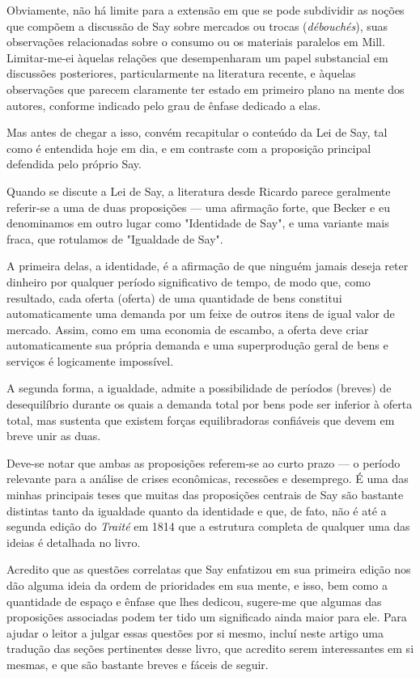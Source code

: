 \documentclass[12pt]{article}
\begin{document}
Obviamente, não há limite para a extensão em que se pode subdividir as noções que compõem a discussão de Say sobre mercados ou trocas (\textit{débouchés}), suas observações relacionadas sobre o consumo ou os materiais paralelos em Mill. Limitar-me-ei àquelas relações que desempenharam um papel substancial em discussões posteriores, particularmente na literatura recente, e àquelas observações que parecem claramente ter estado em primeiro plano na mente dos autores, conforme indicado pelo grau de ênfase dedicado a elas.

Mas antes de chegar a isso, convém recapitular o conteúdo da Lei de Say, tal como é entendida hoje em dia, e em contraste com a proposição principal defendida pelo próprio Say.

Quando se discute a Lei de Say, a literatura desde Ricardo parece geralmente referir-se a uma de duas proposições — uma afirmação forte, que Becker e eu denominamos em outro lugar como "Identidade de Say", e uma variante mais fraca, que rotulamos de "Igualdade de Say".

A primeira delas, a identidade, é a afirmação de que ninguém jamais deseja reter dinheiro por qualquer período significativo de tempo, de modo que, como resultado, cada oferta (oferta) de uma quantidade de bens constitui automaticamente uma demanda por um feixe de outros itens de igual valor de mercado. Assim, como em uma economia de escambo, a oferta deve criar automaticamente sua própria demanda e uma superprodução geral de bens e serviços é logicamente impossível.

A segunda forma, a igualdade, admite a possibilidade de períodos (breves) de desequilíbrio durante os quais a demanda total por bens pode ser inferior à oferta total, mas sustenta que existem forças equilibradoras confiáveis que devem em breve unir as duas.

Deve-se notar que ambas as proposições referem-se ao curto prazo — o período relevante para a análise de crises econômicas, recessões e desemprego. É uma das minhas principais teses que muitas das proposições centrais de Say são bastante distintas tanto da igualdade quanto da identidade e que, de fato, não é até a segunda edição do \textit{Traité} em 1814 que a estrutura completa de qualquer uma das ideias é detalhada no livro.

Acredito que as questões correlatas que Say enfatizou em sua primeira edição nos dão alguma ideia da ordem de prioridades em sua mente, e isso, bem como a quantidade de espaço e ênfase que lhes dedicou, sugere-me que algumas das proposições associadas podem ter tido um significado ainda maior para ele. Para ajudar o leitor a julgar essas questões por si mesmo, incluí neste artigo uma tradução das seções pertinentes desse livro, que acredito serem interessantes em si mesmas, e que são bastante breves e fáceis de seguir.
\end{document}
